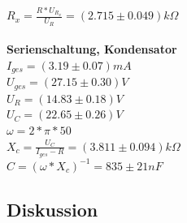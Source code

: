 \documentclass[12pt,a4paper]{article}
\begin{document}
\begin{multicols}{2}
$R_{x} = \frac{R*U_{R_{x}}}{U_{R}} = (2.715 \pm 0.049) k\Omega$\\
\\
\textbf{Serienschaltung, Kondensator}\\
$I_{ges} = (3.19 \pm 0.07) mA$\\
$U_{ges} = (27.15 \pm 0.30) V$\\
$U_{R} = (14.83 \pm 0.18) V$\\
$U_{C} = (22.65 \pm 0.26) V$\\
$\omega = 2*\pi *50$ \\
$X_{c} = \frac{U_{C}}{I_{ges} - R} = (3.811 \pm 0.094) k\Omega$ \\
$C = (\omega * X_{c})^{-1} = 835 \pm 21 nF$ \\

\subsection{Diskussion}


\end{multicols}
\end{document}
